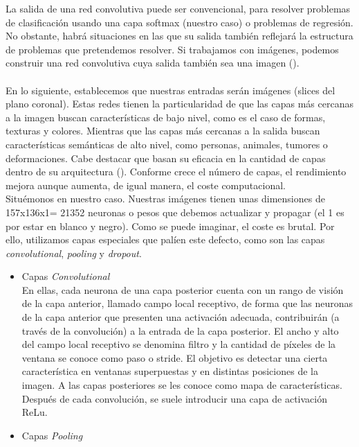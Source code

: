 \begin{itemize}
La salida de una red convolutiva puede ser convencional, para resolver problemas de clasificación usando una capa softmax (nuestro caso) o problemas de regresión. No obstante, habrá situaciones en las que su salida también reflejará la estructura de problemas que pretendemos resolver. Si trabajamos con imágenes, podemos construir una red convolutiva cuya salida también sea una imagen (\cite{berzal}). \\ \\

En lo siguiente, establecemos que nuestras entradas serán imágenes (slices del plano coronal). Estas redes tienen la particularidad de que las capas más cercanas a la imagen buscan características de bajo nivel, como es el caso de formas, texturas y colores. Mientras que las capas más cercanas a la salida buscan características semánticas de alto nivel, como personas, animales, tumores o deformaciones. Cabe destacar que basan su eficacia en la cantidad de capas dentro de su arquitectura (\cite{miriam}). Conforme crece el número de capas, el rendimiento mejora aunque aumenta, de igual manera, el coste computacional. \\

Situémonos en nuestro caso. Nuestras imágenes tienen unas dimensiones de 157x136x1= 21352 neuronas o pesos que debemos actualizar y propagar (el 1 es por estar en blanco y negro). Como se puede imaginar, el coste es brutal. Por ello, utilizamos capas especiales que palíen este defecto, como son las capas \textit{convolutional}, \textit{pooling} y \textit{dropout}.

\begin{itemize}
	\item Capas \textit{Convolutional} \\
	
	En ellas, cada neurona de una capa posterior cuenta con un rango de visión de la capa anterior, llamado campo local receptivo, de forma que las neuronas de la capa anterior que presenten una activación adecuada, contribuirán (a través de la convolución) a la entrada de la capa posterior. El ancho y alto del campo local receptivo  se denomina filtro y la cantidad de píxeles de la ventana se conoce como paso o stride. El objetivo es detectar una cierta característica en ventanas superpuestas y en distintas posiciones de la imagen. A las capas posteriores se les conoce como mapa de características. Después de cada convolución, se suele introducir una capa de activación ReLu.
	
	\item Capas \textit{Pooling} \\
	

\end{itemize}
\end{itemize}
